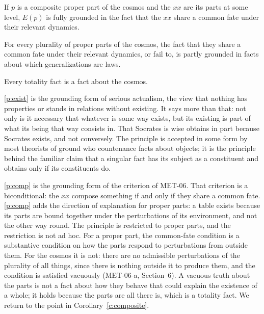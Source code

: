 \documentclass{situationist-preprint}
\begin{document}
\begin{principle}\label{p:comp}
If $p$ is a composite proper part of the cosmos and the $xx$ are its parts at some level, $E(p)$ is fully grounded in the fact that the $xx$ share a common fate under their relevant dynamics.
\end{principle}

\begin{principle}[Dynamics]\label{p:dyn}
For every plurality of proper parts of the cosmos, the fact that they share a common fate under their relevant dynamics, or fail to, is partly grounded in facts about which generalizations are laws.
\end{principle}

\begin{principle}\label{p:tot}
Every totality fact is a fact about the cosmos.
\end{principle}

\ref{p:exist} is the grounding form of serious actualism, the view that nothing has properties or stands in relations without existing. It says more than that: not only is it necessary that whatever is some way exists, but its existing is part of what its being that way consists in. That Socrates is wise obtains in part because Socrates exists, and not conversely. The principle is accepted in some form by most theorists of ground who countenance facts about objects; it is the principle behind the familiar claim that a singular fact has its subject as a constituent and obtains only if its constituents do.

\ref{p:comp} is the grounding form of the criterion of MET-06. That criterion is a biconditional: the $xx$ compose something if and only if they share a common fate. \ref{p:comp} adds the direction of explanation for proper parts: a table exists because its parts are bound together under the perturbations of its environment, and not the other way round. The principle is restricted to proper parts, and the restriction is not ad hoc. For a proper part, the common-fate condition is a substantive condition on how the parts respond to perturbations from outside them. For the cosmos it is not: there are no admissible perturbations of the plurality of all things, since there is nothing outside it to produce them, and the condition is satisfied vacuously (MET-06-a, Section~6). A vacuous truth about the parts is not a fact about how they behave that could explain the existence of a whole; it holds because the parts are all there is, which is a totality fact. We return to the point in Corollary~\ref{c:composite}.
\end{document}
